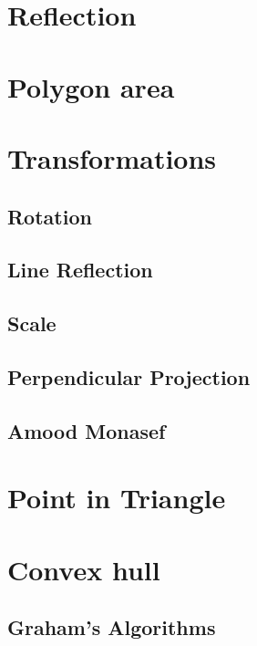 	\section{Reflection}
	\section{Polygon area}
	\section{Transformations}
		\subsection{Rotation}
		\subsection{Line Reflection}
		\subsection{Scale}
		\subsection{Perpendicular Projection}
		\subsection{Amood Monasef}
	\section{Point in Triangle}
	\section{Convex hull}
		\subsection{Graham's Algorithms}
